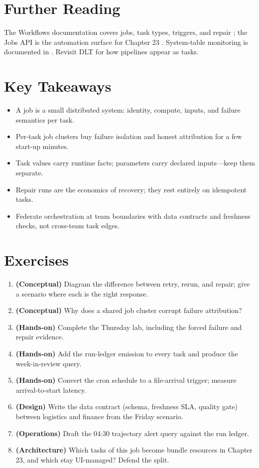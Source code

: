 \section{Further Reading}
The Workflows documentation covers jobs, task types, triggers, and repair \cite{databricksWorkflows}; the Jobs API is the automation surface for Chapter 23 \cite{databricksJobsAPI}. System-table monitoring is documented in \cite{databricksSystemTables}. Revisit DLT \cite{databricksDLT} for how pipelines appear as tasks.

\section*{Key Takeaways}
\begin{itemize}
    \item A job is a small distributed system: identity, compute, inputs, and failure semantics per task.
    \item Per-task job clusters buy failure isolation and honest attribution for a few start-up minutes.
    \item Task values carry runtime facts; parameters carry declared inputs---keep them separate.
    \item Repair runs are the economics of recovery; they rest entirely on idempotent tasks.
    \item Federate orchestration at team boundaries with data contracts and freshness checks, not cross-team task edges.
\end{itemize}

\section{Exercises}
\begin{enumerate}
    \item \textbf{(Conceptual)} Diagram the difference between retry, rerun, and repair; give a scenario where each is the right response.
    \item \textbf{(Conceptual)} Why does a shared job cluster corrupt failure attribution?
    \item \textbf{(Hands-on)} Complete the Thursday lab, including the forced failure and repair evidence.
    \item \textbf{(Hands-on)} Add the run-ledger emission to every task and produce the week-in-review query.
    \item \textbf{(Hands-on)} Convert the cron schedule to a file-arrival trigger; measure arrival-to-start latency.
    \item \textbf{(Design)} Write the data contract (schema, freshness SLA, quality gate) between logistics and finance from the Friday scenario.
    \item \textbf{(Operations)} Draft the 04:30 trajectory alert query against the run ledger.
    \item \textbf{(Architecture)} Which tasks of this job become bundle resources in Chapter 23, and which stay UI-managed? Defend the split.
\end{enumerate}

